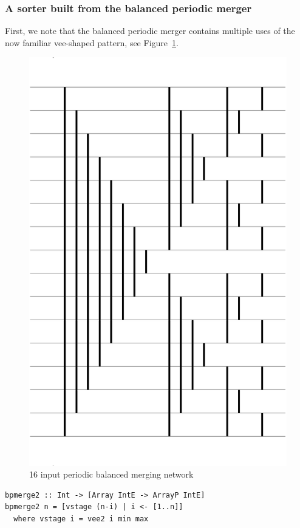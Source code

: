 \subsubsection{A sorter built from the balanced periodic merger}
First, we note that the balanced periodic merger contains multiple
uses of the now familiar vee-shaped pattern, see Figure~\ref{fig:periodicMerger}.
\begin{figure}
\centering
\includegraphics[scale=0.25]{./expressive/balanced}
\caption{16 input periodic balanced merging network}
\label{fig:periodicMerger}
\end{figure}

\begin{codesize}
\begin{verbatim}
bpmerge2 :: Int -> [Array IntE -> ArrayP IntE]
bpmerge2 n = [vstage (n-i) | i <- [1..n]]
  where vstage i = vee2 i min max
\end{verbatim}
\end{codesize}


